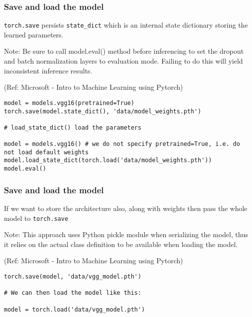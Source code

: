 \begin{frame}[fragile] \frametitle{Save and load the model}

\lstinline|torch.save| persists \lstinline|state_dict| which is an internal state dictionary storing the learned parameters.

Note: Be sure to call model.eval() method before inferencing to set the dropout and batch normalization layers to evaluation mode. Failing to do this will yield inconsistent inference results.

\tiny{(Ref: Microsoft - Intro to Machine Learning using Pytorch)}

\begin{lstlisting}
model = models.vgg16(pretrained=True)
torch.save(model.state_dict(), 'data/model_weights.pth')

# load_state_dict() load the parameters 

model = models.vgg16() # we do not specify pretrained=True, i.e. do not load default weights
model.load_state_dict(torch.load('data/model_weights.pth'))
model.eval()
\end{lstlisting}


\end{frame}


\begin{frame}[fragile] \frametitle{Save and load the model}

If we want to store the architecture also, along with weights then pass the whole model to \lstinline|torch.save|

Note: This approach uses Python pickle module when serializing the model, thus it relies on the actual class definition to be available when loading the model.

\tiny{(Ref: Microsoft - Intro to Machine Learning using Pytorch)}

\begin{lstlisting}
torch.save(model, 'data/vgg_model.pth')

# We can then load the model like this:

model = torch.load('data/vgg_model.pth')
\end{lstlisting}


\end{frame}

